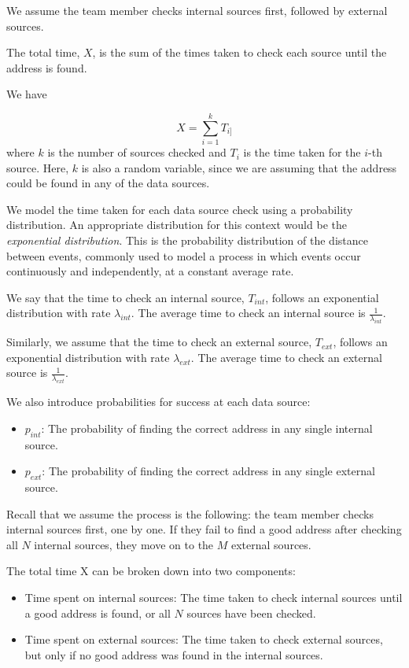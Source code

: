 \documentclass{article}
\begin{document}
We assume the team member checks internal sources first, followed by external sources.

The total time, $X$, is the sum of the times taken to check each source until the address is found.

We have

\begin{equation}
X = \sum_{i=1}^{k} T_{i]}
\end{equation}
where $k$ is the number of sources checked and $T_{i}$ is the time taken for the $i$-th source. Here, $k$ is also a random variable, since we are assuming that the address could be found in any of the data sources.

We model the time taken for each data source check using a probability distribution. An appropriate distribution for this context would be the \emph{exponential distribution}. This is the probability distribution of the distance between events, commonly used to model a process in which events occur continuously and independently, at a constant average rate.

We say that the time to check an internal source, $T_{int}$,  follows an exponential distribution with rate $\lambda_{int}$. The average time to check an internal source is $\frac{1}{\lambda_{int}}$.

Similarly, we assume that the time to check an external source, $T_{ext}$, follows an exponential distribution with rate $\lambda_{ext}$. The average time to check an external source is $\frac{1}{\lambda_{ext}}$.

We also introduce probabilities for success at each data source:

\begin{itemize}
\item $p_{int}$: The probability of finding the correct address in any single internal source.
\item $p_{ext}$: The probability of finding the correct address in any single external source.
\end{itemize}

Recall that we assume the process is the following: the team member checks internal sources first, one by one. If they fail to find a good address after checking all $N$ internal sources, they move on to the $M$ external sources.

The total time X can be broken down into two components:

\begin{itemize}
\item Time spent on internal sources: The time taken to check internal sources until a good address is found, or all $N$ sources have been checked.

\item Time spent on external sources: The time taken to check external sources, but only if no good address was found in the internal sources.
\end{itemize}
\end{document}
